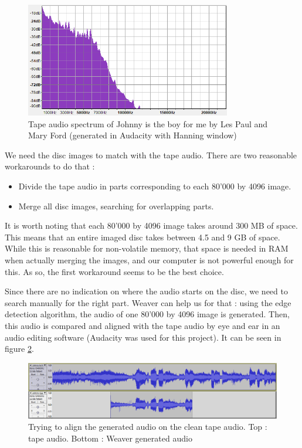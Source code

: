 \documentclass[12pt, twoside]{article}
\begin{document}
\begin{figure}
	\centering
	\includegraphics[width=0.8\textwidth]{../images/spectrum_johnny.png}
	\caption{Tape audio spectrum of Johnny is the boy for me by Les Paul and Mary Ford (generated in Audacity\cite{audacity} with Hanning window)}
	\label{spectrum_johnny}
\end{figure}

We need the disc images to match with the tape audio. There are two reasonable workarounds to do that :
\begin{itemize}
	\item Divide the tape audio in parts corresponding to each 80'000 by 4096 image.
	\item Merge all disc images, searching for overlapping parts.
\end{itemize}

It is worth noting that each 80'000 by 4096 image takes around 300 MB of space. This means that an entire imaged disc takes between 4.5 and 9 GB of space. While this is reasonable for non-volatile memory, that space is needed in RAM when actually merging the images, and our computer is not powerful enough for this. As so, the first workaround seems to be the best choice.

Since there are no indication on where the audio starts on the disc, we need to search manually for the right part. Weaver can help us for that : using the edge detection algorithm, the audio of one 80'000 by 4096 image is generated. Then, this audio is compared and aligned with the tape audio by eye and ear in an audio editing software (Audacity\cite{audacity} was used for this project). It can be seen in figure \ref{aligning}.

\begin{figure}
	\centering
	\includegraphics[width=1.0\textwidth]{../images/aligning.png}
	\caption{Trying to align the generated audio on the clean tape audio. Top : tape audio. Bottom : Weaver generated audio}
	\label{aligning}
\end{figure}
\end{document}
